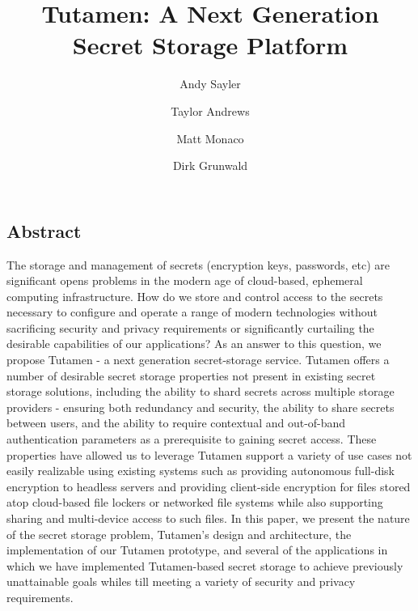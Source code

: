 \documentclass[letterpaper,twocolumn,10pt]{article}
\begin{document}
\date{}

\title{\Large \bf Tutamen: A Next Generation Secret Storage Platform}

\author{Andy Sayler}
\author{Taylor Andrews}
\author{Matt Monaco}
\author{Dirk Grunwald}

\maketitle


\subsection*{Abstract}

The storage and management of secrets (encryption keys, passwords,
etc) are significant opens problems in the modern age of cloud-based,
ephemeral computing infrastructure. How do we store and control access
to the secrets necessary to configure and operate a range of modern
technologies without sacrificing security and privacy requirements or
significantly curtailing the desirable capabilities of our
applications? As an answer to this question, we propose Tutamen - a
next generation secret-storage service. Tutamen offers a number of
desirable secret storage properties not present in existing secret
storage solutions, including the ability to shard secrets across
multiple storage providers - ensuring both redundancy and security,
the ability to share secrets between users, and the ability to require
contextual and out-of-band authentication parameters as a prerequisite
to gaining secret access. These properties have allowed us to leverage
Tutamen support a variety of use cases not easily realizable using
existing systems such as providing autonomous full-disk encryption to
headless servers and providing client-side encryption for files stored
atop cloud-based file lockers or networked file systems while also
supporting sharing and multi-device access to such files. In this
paper, we present the nature of the secret storage problem, Tutamen's
design and architecture, the implementation of our Tutamen prototype,
and several of the applications in which we have implemented
Tutamen-based secret storage to achieve previously unattainable goals
whiles till meeting a variety of security and privacy requirements.
\end{document}
